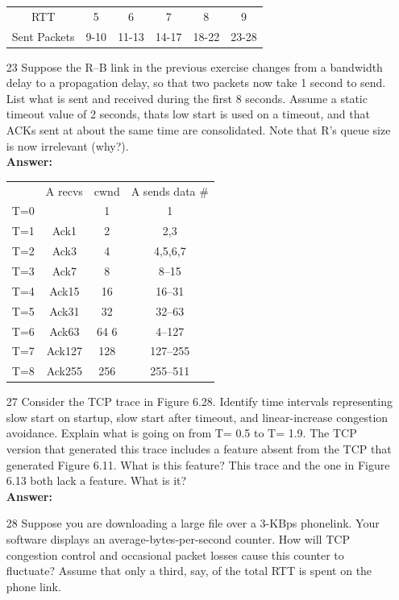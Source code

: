 \documentclass[a4paper]{article}
\begin{document}
\begin{itemize}
\begin{tabular}{cccccc}
			  RTT & 5 & 6 & 7 & 8 & 9 \\
			  Sent Packets & 9-10 & 11-13 & 14-17 & 18-22 & 23-28 \\
		  \end{tabular} 
	\item[23] Suppose the R–B link in the previous exercise changes from a bandwidth delay to a propagation delay, so that two packets now take 1 second to send. List what is sent and received during the first 8 seconds. Assume a static timeout value of 2 seconds, thats low start is used on a timeout, and that ACKs sent at about the same time are consolidated. Note that R’s queue size is now irrelevant (why?). \\
	      \textbf{Answer:} 
	      \begin{tabular}{cccc}
	      	    & A recvs & cwnd & A sends data \# \\
	      	T=0 &         & 1    & 1               \\
	      	T=1 & Ack1    & 2    & 2,3             \\
	      	T=2 & Ack3    & 4    & 4,5,6,7         \\
	      	T=3 & Ack7    & 8    & 8–15          \\
	      	T=4 & Ack15   & 16   & 16–31         \\
	      	T=5 & Ack31   & 32   & 32–63         \\
	      	T=6 & Ack63   & 64 6 & 4–127         \\
	      	T=7 & Ack127  & 128  & 127–255       \\
	      	T=8 & Ack255  & 256  & 255–511       \\
	      \end{tabular}
	\item[27] Consider the TCP trace in Figure 6.28. Identify time intervals representing slow start on startup, slow start after timeout, and linear-increase congestion avoidance. Explain what is going on from T= 0.5 to T= 1.9. The TCP version that generated this trace includes a feature absent from the TCP that generated Figure 6.11. What is this feature? This trace and the one in Figure 6.13 both lack a feature. What is it? \\
	      \textbf{Answer:} 
	\item[28] Suppose you are downloading a large file over a 3-KBps phonelink. Your software displays an average-bytes-per-second counter. How will TCP congestion control and occasional packet losses cause this counter to fluctuate? Assume that only a third, say, of the total RTT is spent on the phone link. \\

\end{itemize}
\end{document}
